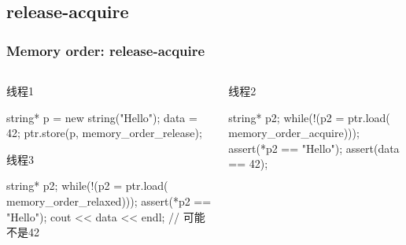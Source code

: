\documentclass[UTF8,lualatex]{ctexbeamer}
\begin{document}

\subsection{release-acquire}

\begin{frame}[fragile]
    \frametitle{Memory order: release-acquire}
    \scriptsize
    \begin{columns}
        \begin{column}{.5\textwidth}
            \begin{block}{线程1}
                \begin{cppcode}
                    string* p = new string("Hello");
                    data = 42;
                    ptr.store(p, memory_order_release);
                \end{cppcode}
            \end{block}
            \begin{block}{线程3}
                \begin{cppcode}
                    string* p2;
                    while(!(p2 = ptr.load(
                        memory_order_relaxed)));
                    assert(*p2 == "Hello");
                    cout << data << endl; // 可能不是42
                \end{cppcode}
            \end{block}
        \end{column}
        \begin{column}{.5\textwidth}
            \begin{block}{线程2}
                \begin{cppcode}
                    string* p2;
                    while(!(p2 = ptr.load(
                        memory_order_acquire)));
                    assert(*p2 == "Hello");
                    assert(data == 42);
                \end{cppcode}
            \end{block}
        \end{column}
    \end{columns}
\end{frame}

\end{document}
